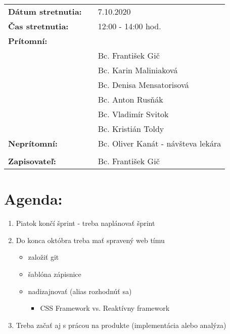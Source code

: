 \documentclass{article}
\begin{document}
    

    \begin{table}[h]
        \begin{tabular}{lllll}
            \multicolumn{3}{l}{\textbf{Dátum stretnutia:}} & & 7.10.2020 \\
            \multicolumn{3}{l}{\textbf{Čas stretnutia:}} & & 12:00 - 14:00 hod. \\
            \multicolumn{3}{l}{\textbf{Prítomní:}} \\
            & & & & Bc. František Gič  \\
            & & & & Bc. Karin Maliniaková \\
            & & & & Bc. Denisa Mensatorisová \\
            & & & & Bc. Anton Rusňák \\
            & & & & Bc. Vladimír Svitok \\
            & & & & Bc. Kristián Toldy \\
            \multicolumn{3}{l}{\textbf{Neprítomní:}} & &  Bc. Oliver Kanát - návšteva lekára \\\\
            \multicolumn{3}{l}{\textbf{Zapisovateľ:}} & & Bc. František Gič \\
        \end{tabular}
        \label{tab:grades}
    \end{table}

    \section*{Agenda:}

    \begin{enumerate}
        \item Piatok končí šprint - treba naplánovať šprint
        \item Do konca októbra treba mať spravený web tímu
        \begin{itemize}
            \item založiť git
            \item šablóna zápisnice
            \item nadizajnovať (alias rozhodnúť sa)
            \begin{itemize}
                \item CSS Framework vs. Reaktívny framework
            \end{itemize}
        \end{itemize}
        \item Treba začať aj s prácou na produkte (implementácia alebo analýza) 
    \end{enumerate}
\end{document}
